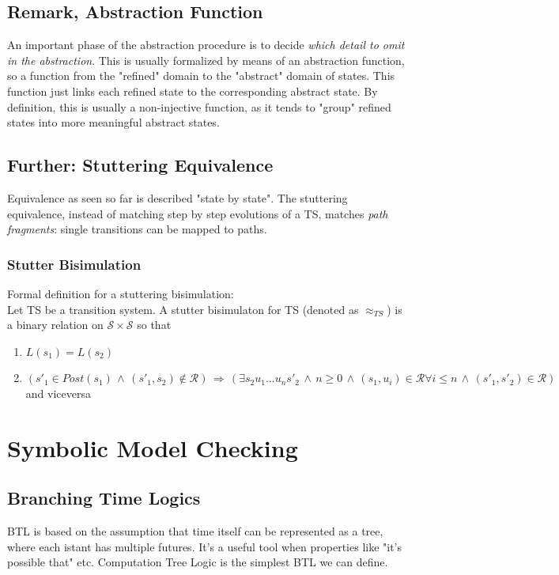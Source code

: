 \documentclass{article}
\begin{document}
			\subsection{Remark, Abstraction Function}
				An important phase of the abstraction procedure is to decide \emph{which detail to omit in the abstraction}. This is usually formalized by means of an abstraction function, so a function from the "refined" domain to the "abstract" domain of states. This function just links each refined state to the corresponding abstract state. By definition, this is usually a non-injective function, as it tends to "group" refined states into more meaningful abstract states.
				
			\subsection{Further: Stuttering Equivalence}
				Equivalence as seen so far is described "state by state". The stuttering equivalence, instead of matching step by step evolutions of a TS, matches \emph{path fragments}: single transitions can be mapped to paths.
				
				\subsubsection{Stutter Bisimulation}
					Formal definition for a stuttering bisimulation:\\
					Let TS be a transition system. A stutter bisimulaton for TS (denoted as $\approx_{TS}$) is a binary relation on $\mathcal{S} \times \mathcal{S}$ so that
					\begin{enumerate}
						\item $L(s_1) = L(s_2)$
						\item $ (s'_1 \in Post(s_1) \,\wedge\, (s'_1, s_2) \notin \mathcal{R}) \,\Rightarrow\, (\exists s_2 u_1 ... u_n s'_2 \,\wedge\, n \geq 0 \,\wedge\, (s_1, u_i) \in \mathcal{R} \forall i \leq n \,\wedge\, (s'_1, s'_2) \in \mathcal{R})$ and viceversa
					\end{enumerate}
					
		\section{Symbolic Model Checking}
			\subsection{Branching Time Logics}
				BTL is based on the assumption that time itself can be represented as a tree, where each istant has multiple futures. It's a useful tool when properties like "it's possible that" etc. Computation Tree Logic is the simplest BTL we can define.
				
\end{document}
